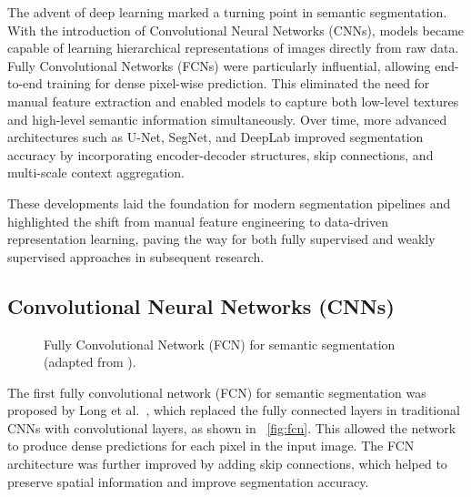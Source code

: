 The advent of deep learning marked a turning point in semantic segmentation. With the introduction of Convolutional Neural Networks (CNNs), models became capable of learning hierarchical representations of images directly from raw data. Fully Convolutional Networks (FCNs) were particularly influential, allowing end-to-end training for dense pixel-wise prediction. This eliminated the need for manual feature extraction and enabled models to capture both low-level textures and high-level semantic information simultaneously. Over time, more advanced architectures such as U-Net, SegNet, and DeepLab improved segmentation accuracy by incorporating encoder-decoder structures, skip connections, and multi-scale context aggregation.

These developments laid the foundation for modern segmentation pipelines and highlighted the shift from manual feature engineering to data-driven representation learning, paving the way for both fully supervised and weakly supervised approaches in subsequent research.
\subsection{Convolutional Neural Networks (CNNs)}
\label{subsec:cnn_sem_seg}

\begin{figure}[htbp]
    \centering
    \caption{Fully Convolutional Network (FCN) for semantic segmentation (adapted from \cite{fsss_fcn}).}
    \label{fig:fcn}
\end{figure}

The first fully convolutional network (FCN) for semantic segmentation was proposed by Long et al.~\cite{fsss_fcn}, which replaced the fully connected layers in traditional CNNs with convolutional layers, as shown in ~\autoref{fig:fcn}. This allowed the network to produce dense predictions for each pixel in the input image. The FCN architecture was further improved by adding skip connections, which helped to preserve spatial information and improve segmentation accuracy.


